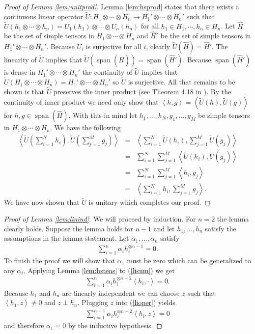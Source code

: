 \documentclass[aos,preprint]{imsart}
\def\l{\left}
\def\r{\right}
\def\spn{\operatorname{span}}
\theoremstyle{plain}
\theoremstyle{defintion}
\begin{document}
	\begin{proof}[Proof of Lemma \ref{lem:unitprod}]
		Lemma \ref{lem:hsprod} states that there exists a continuous linear operator $\tilde{U}:H_1 \otimes \cdots \otimes H_n \to H_1' \otimes \cdots \otimes H_n'$ such that $\tilde{U}\left( h_1 \otimes\cdots \otimes h_n \right) = U_1(h_1) \otimes \cdots \otimes U_n(h_n)$ for all $h_1 \in H_1 ,\cdots, h_n \in H_n$. Let $\widehat{H}$ be the set of simple tensors in $H_1 \otimes \cdots \otimes H_n$ and $\widehat{H}'$ be the set of simple tensors in $H_1'\otimes \cdots \otimes H_n'$. Because $U_i$ is surjective for all $i$, clearly $\tilde{U}(\widehat{H}) = \widehat{H}'$. The linearity of $\tilde{U}$ implies that $\tilde{U}(\spn(\widehat{H}))= \spn(\widehat{H}')$. Because $\spn(\widehat{H}')$ is dense in $H_1'\otimes \cdots \otimes H_n'$ the continuity of $\tilde{U}$ implies that $\tilde{U}(H_1\otimes\cdots \otimes H_n) = H_1'\otimes \cdots \otimes H_n'$ so $\tilde{U}$ is surjective. All that remains to be shown is that $\tilde{U}$ preserves the inner product (see Theorem 4.18 in \cite{introhilb}). By the continuity of inner product we need only show that $\l<h, g\r>=\l<\tilde{U}(h), \tilde{U}(g)\r>$ for $h,g \in \spn(\widehat{H})$. With this in mind let $h_1,\ldots, h_N,g_1,\ldots,g_M$ be simple tensors in $H_1\otimes \cdots \otimes H_n$. We have the following
		\begin{eqnarray*}
			\l<\tilde{U}\l(\sum_{i=1}^N h_i\r),\tilde{U}\l(\sum_{j=1}^M g_j\r) \r>
			&=& \l<\sum_{i=1}^N \tilde{U}\l(h_i\r),\sum_{j=1}^M \tilde{U}\l(g_j\r) \r>\\
		 &=& \sum_{i=1}^N\sum_{j=1}^M\l< \tilde{U}\l(h_i\r), \tilde{U}\l(g_j\r) \r>\\
		 &=& \sum_{i=1}^N\sum_{j=1}^M\l< h_i, g_j \r>\\
		 &=& \l< \sum_{i=1}^Nh_i, \sum_{j=1}^M g_j \r>.
		\end{eqnarray*}
		We have now shown that $\tilde{U}$ is unitary which completes our proof.
	\end{proof}
	\begin{proof}[Proof of Lemma \ref{lem:linind}]
		We will proceed by induction. For $n=2$ the lemma clearly holds. Suppose the lemma holds for $n-1$ and let $h_1,\ldots, h_n$ satisfy the assumptions in the lemma statement. Let $\alpha_1,\ldots, \alpha_n$ satisfy
		\begin{eqnarray}
			\sum_{i=1}^n \alpha_i h_i^{\otimes n-1}  = 0. \label{lisum}
		\end{eqnarray}
		To finish the proof we will show that $\alpha_1$ must be zero which can be generalized to any $\alpha_i$.
		Applying Lemma \ref{lem:hstens} to (\ref{lisum}) we get
		\begin{eqnarray}
			\sum_{i=1}^n \alpha_i h_i^{\otimes n-2}  \l<h_i, \cdot \r>  = 0. \label{lioper}
		\end{eqnarray}
		Because $h_1$ and $h_n$ are linearly independent we can choose $z$ such that $\l<h_1,z\r> \neq 0$ and $z\perp h_n$. Plugging $z$ into (\ref{lioper}) yields
		\begin{eqnarray*}
			\sum_{i=1}^{n-1} \alpha_i h_i^{\otimes n-2}\l<h_i, z \r>  = 0 
		\end{eqnarray*}
		and therefore $\alpha_1=0$ by the inductive hypothesis.
	\end{proof}
\end{document}
